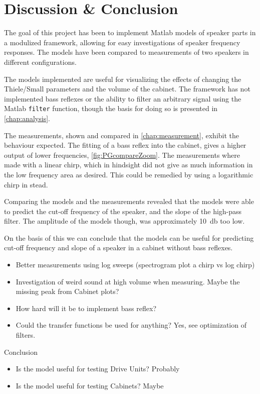 
\chapter{Discussion \& Conclusion}
\label{sec:discussion}

The goal of this project has been to implement Matlab models of speaker parts in a modulized framework, allowing for easy investigations of speaker frequency responses.
The models have been compared to measurements of two speakers in different configurations.

The models implemented are useful for visualizing the effects of changing the Thiele/Small parameters and the volume of the cabinet.
The framework has not implemented bass reflexes or the ability to filter an arbitrary signal using the Matlab \texttt{filter} function, though the basis for doing so is presented in \cref{chap:analysis}.

The measurements, shown and compared in \cref{chap:measurement}, exhibit the behaviour expected.
The fitting of a bass reflex into the cabinet, gives a higher output of lower frequencies, \cref{fig:PGcompareZoom}.
The measurements where made with a linear chirp, which in hindsight did not give as much information in the low frequency area as desired.
This could be remedied by using a logarithmic chirp in stead.

Comparing the models and the measurements revealed that the models were able to predict the cut-off frequency of the speaker, and the slope of the high-pass filter.
The amplitude of the models though, was approximately \SI{10}{\decibel} too low.

On the basis of this we can conclude that the models can be useful for predicting cut-off frequency and slope of a speaker in a cabinet without bass reflexes.

\begin{itemize}
	\item Better measurements using log sweeps (spectrogram plot a chirp vs log chirp)
	\item Investigation of weird sound at high volume when measuring. Maybe the missing peak from Cabinet plots?
	\item How hard will it be to implement bass reflex?
	\item Could the transfer functions be used for anything? Yes, see optimization of filters.
\end{itemize}

Conclusion
\begin{itemize}
	\item Is the model useful for testing Drive Units? Probably
	\item Is the model useful for testing Cabinets? Maybe
\end{itemize}